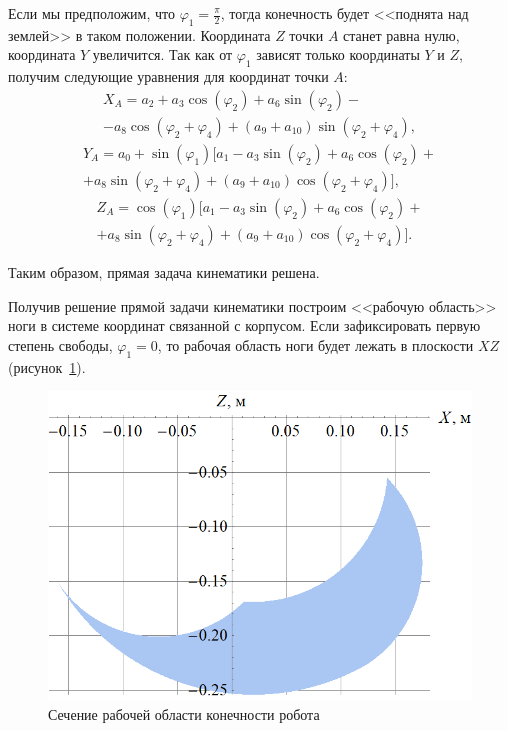 \noindent Если мы предположим, что $ \varphi_1 = \frac \pi 2 $, тогда конечность будет <<поднята над землей>> в таком положении. Координата $ Z $ точки $ A $ станет равна нулю, координата $ Y $ увеличится. Так как от $ \varphi_1 $ зависят только координаты $Y$ и $Z$, получим следующие уравнения для координат точки $A$:
\begin{multline}
    X_A=a_2+a_3\cos(\varphi_2)+a_6\sin(\varphi_2)-\\-a_8 \cos(\varphi _2+\varphi _4)+(a_9+a_{10}) \sin(\varphi _2+\varphi _4) ,
\end{multline}
\begin{multline}
    Y_A=a_0+\sin(\varphi_1)[a_1-a_3 \sin(\varphi _2)+a_6 \cos(\varphi _2)+\\+a_8 \sin(\varphi _2+\varphi _4)+(a_9+a_{10}) \cos(\varphi _2+\varphi _4)] ,
\end{multline}
\begin{multline}
    Z_A=\cos(\varphi_1)[a_1-a_3 \sin(\varphi _2)+a_6 \cos(\varphi _2)+\\+a_8 \sin(\varphi _2+\varphi _4)+(a_9+a_{10}) \cos(\varphi _2+\varphi _4)].
\end{multline}

\noindent Таким образом, прямая задача кинематики решена.

Получив решение прямой задачи кинематики построим <<рабочую область>> ноги в системе координат связанной с корпусом. Если зафиксировать первую степень свободы, $ \varphi_1 = 0 $, то рабочая область ноги будет лежать в плоскости $ XZ $ (рисунок~\ref{fig:rab_obl}).
\begin{figure}[h]
    \centering
    \includegraphics[scale=0.5]{chapter_kinematics/figure3.png}
    \caption{Сечение рабочей области конечности робота}
    \label{fig:rab_obl}
\end{figure}


